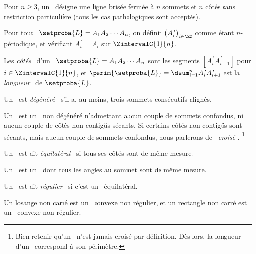 \begin{defi}
	Pour $n \geq 3$, un \og \emph{\ncycle} \fg\ désigne une ligne brisée fermée à $n$ sommets et $n$ côtés sans restriction particulière (tous les cas pathologiques sont acceptés).
\end{defi}


\begin{defi}
    Pour tout \ncycle\ $\setproba{L} = A_1 A_2 \cdots A_n$, on définit $\big( A^{\,\prime}_i \big)_{i \in \ZZ}$ comme étant $n$-périodique, et vérifiant $A^{\,\prime}_{i} = A_i$ sur $\ZintervalC{1}{n}$.
\end{defi}


\begin{defi}
	Les \og \emph{côtés} \fg\ d'un \ncycle\ $\setproba{L} = A_1 A_2 \cdots A_n$ sont les segments
	$[A^{\,\prime}_i A^{\,\prime}_{i+1}]$ pour $i \in \ZintervalC{1}{n}$,
	et $\perim{\setproba{L}} = \dsum_{i=1}^{n} A^{\,\prime}_i A^{\,\prime}_{i+1}$ est la \og \emph{longueur} \fg\ de $\setproba{L}$.
\end{defi}




\begin{defi}
	Un \ncycle\ est \og \emph{dégénéré} \fg\ s'il a, au moins, trois sommets consécutifs alignés.
\end{defi}




\begin{defi}
	Un \og \emph{\ngone} \fg\ est un \ncycle\ non dégénéré n'admettant aucun couple de sommets confondus, ni aucun couple de côtés non contigüs sécants.
	Si certains côtés non contigüs sont sécants, mais aucun couple de sommets confondus, nous parlerons de \og \emph{\ngone\ croisé} \fg.%
	\footnote{
		Bien retenir qu'un \ngone\ n'est jamais croisé par définition.
		Dès lors, la longueur d'un \ngone\ correspond à son périmètre.
	}
\end{defi}


\begin{defi}
	Un \ngone\ est dit \og \emph{équilatéral} \fg\ si tous ses côtés sont de même mesure.
\end{defi}


\begin{defi}
	Un \og \emph{\niso} \fg\ est un \ngone\ dont tous les angles au sommet sont de même mesure.
\end{defi}


\begin{defi}
	Un \ngone\ est dit \og \emph{régulier} \fg\ si c'est un \niso\ équilatéral.
\end{defi}


\begin{remark}
	Un losange non carré est un \nequi\ convexe non régulier, et un rectangle non carré est un \niso\ convexe non régulier.
\end{remark}
